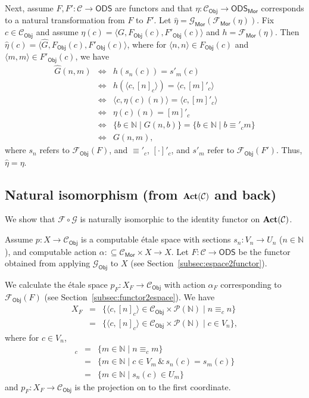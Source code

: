 \documentclass[envcountsame]{llncs}
\def\IN{{\mathbb N}}
\def\calC{{\mathcal{C}}}
\def\calF{{\mathcal{F}}}
\def\calG{{\mathcal{G}}}
\def\calP{{\mathcal{P}}}
\newcommand{\cntSets}{{\mathsf{ODS}}}
\newcommand{\Mor}{\mathsf{Mor}}
\newcommand{\Obj}{\mathsf{Obj}}
\def\act{{\mathrm{\bold{Act}}}}
\begin{document}
Next, assume $F,F'\colon \calC \to\cntSets$ are functors and that $\eta\colon \calC_\Obj \to \cntSets_\Mor$ corresponds to a natural transformation from $F$ to $F'$. Let $\widehat{\eta} = \calG_\Mor(\calF_\Mor(\eta))$. Fix $c\in \calC_\Obj$ and assume $\eta(c) = \langle G, F_\Obj(c), F'_\Obj(c)\rangle$ and $h = \calF_\Mor(\eta)$. Then $\widehat{\eta}(c) = \langle \widehat{G}, F_\Obj(c), F'_\Obj(c)\rangle$, where for $\langle n,n\rangle \in F_\Obj(c)$ and $\langle m,m\rangle \in F'_\Obj(c)$, we have
\begin{eqnarray*}
\widehat{G}(n,m) &\iff& h(s_n(c)) = s'_m(c)\\
&\iff& h(\langle c,[n]_c\rangle) = \langle c,[m]'_c\rangle\\
&\iff& \langle c, \eta(c)(n)\rangle = \langle c,[m]'_c\rangle\\
&\iff& \eta(c)(n) = [m]'_c\\
&\iff& \{ b\in\IN \mid G(n,b)\} = \{ b\in\IN \mid b \equiv'_c m\}\\
&\iff& G(n,m),
\end{eqnarray*}
where $s_n$ refers to $\calF_\Obj(F)$, and $\equiv'_c$, $[\cdot]'_c$, and $s'_m$ refer to $\calF_\Obj(F')$. Thus, $\widehat{\eta}=\eta$.




\subsection{Natural isomorphism (from $\act(\calC)$ and back)}

We show that $\calF\circ\calG$ is naturally isomorphic to the identity functor on $\act(\calC)$.

Assume $p\colon X\to\calC_\Obj$ is a computable \'{e}tale space with sections $s_n\colon V_n \to U_n$ ($n\in\IN$), and computable action  $\alpha:\subseteq \calC_\Mor \times X \to X$. Let $F\colon \calC\to\cntSets$ be the functor obtained from applying $\calG_\Obj$ to $X$ (see Section~\ref{subsec:espace2functor}).

We calculate the \'{e}tale space $p_F\colon X_F\to\calC_\Obj$ with action $\alpha_F$ corresponding to $\calF_\Obj(F)$ (see Section~\ref{subsec:functor2espace}). We have 
\begin{eqnarray*}
X_F &=& \{ \langle c, [n]_c \rangle \in \calC_\Obj \times \calP(\IN) \mid n \equiv_c n \}\\
&=& \{ \langle c, [n]_c \rangle \in \calC_\Obj \times \calP(\IN) \mid c\in V_n\},
\end{eqnarray*}
where for $c\in V_n$,
\begin{eqnarray*}
[n]_c &=&\{ m\in\IN\mid n \equiv_c m\}\\
&=&\{ m\in\IN\mid  c\in V_m \,\&\, s_n(c)=s_m(c)\}\\
&=&\{ m\in\IN\mid  s_n(c) \in U_m\}
\end{eqnarray*}
and $p_F\colon X_F\to\calC_\Obj$ is the projection on to the first coordinate. 
\end{document}
